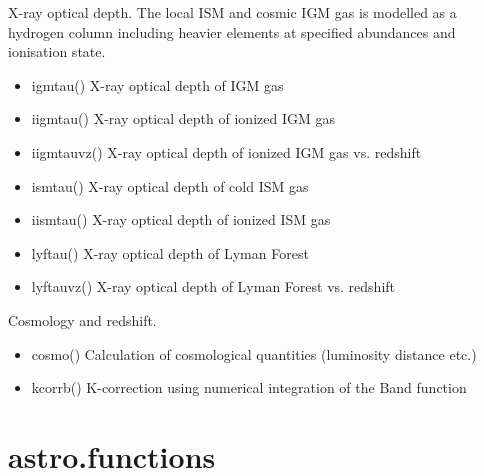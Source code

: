 \documentclass[letterpaper,10pt,english]{sphinxmanual}
\begin{document}
X-ray optical depth. The local ISM and cosmic IGM gas is modelled as a hydrogen column including heavier elements at specified abundances and ionisation state.
\begin{itemize}
\item {} 
igmtau() X-ray optical depth of IGM gas

\item {} 
iigmtau() X-ray optical depth of ionized IGM gas

\item {} 
iigmtauvz() X-ray optical depth of ionized IGM gas vs. redshift

\item {} 
ismtau() X-ray optical depth of cold ISM gas

\item {} 
iismtau() X-ray optical depth of ionized ISM gas

\item {} 
lyftau() X-ray optical depth of Lyman Forest

\item {} 
lyftauvz() X-ray optical depth of Lyman Forest vs. redshift

\end{itemize}

Cosmology and redshift.
\begin{itemize}
\item {} 
cosmo() Calculation of cosmological quantities (luminosity distance etc.)

\item {} 
kcorrb() K-correction using numerical integration of the Band function

\end{itemize}


\section{astro.functions}
\label{\detokenize{astro_functions:module-astro}}\label{\detokenize{astro_functions:astro-functions}}\label{\detokenize{astro_functions::doc}}
\end{document}
